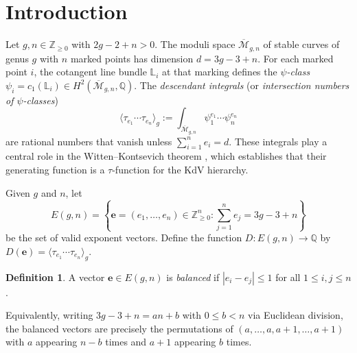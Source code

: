 \documentclass[12pt,reqno]{amsart}
\theoremstyle{definition}
\newtheorem{definition}[theorem]{Definition}
\newcommand{\humaninline}[1]{{\color{humancolor}\uwave{#1}}}
\newcommand{\aiinline}[1]{{\color{aicolor}\uwave{#1}}}
\newcommand{\Mbar}{\overline{\mathcal{M}}}
\newcommand{\ee}{\mathbf{e}}
\newcommand{\ZZ}{\mathbb{Z}}
\newcommand{\QQ}{\mathbb{Q}}
\begin{document}
\section{Introduction}\label{sec:intro}

\begin{aiparagraph}
Let $g, n \in \ZZ_{\geq 0}$ with $2g - 2 + n > 0$. The moduli space $\Mbar_{g,n}$ of stable curves of genus $g$ with $n$ marked points has dimension $d = 3g - 3 + n$. For each marked point $i$, the cotangent line bundle $\mathbb{L}_i$ at that marking defines the \emph{$\psi$-class} $\psi_i = c_1(\mathbb{L}_i) \in H^2(\Mbar_{g,n}, \QQ)$. The \emph{descendant integrals} (or \emph{intersection numbers of $\psi$-classes})
\[
\langle \tau_{e_1} \cdots \tau_{e_n} \rangle_g := \int_{\Mbar_{g,n}} \psi_1^{e_1} \cdots \psi_n^{e_n}
\]
are rational numbers that vanish unless $\sum_{i=1}^n e_i = d$. These integrals play a central role in the Witten--Kontsevich theorem \cite{Witten1991, Kontsevich1992}, which establishes that their generating function is a $\tau$-function for the KdV hierarchy.

Given $g$ and $n$, let
\[
E(g,n) = \left\{ \ee = (e_1, \ldots, e_n) \in \ZZ_{\geq 0}^n : \sum_{j=1}^n e_j = 3g - 3 + n \right\}
\]
be the set of valid exponent vectors. Define the function $D : E(g,n) \to \QQ$ by $D(\ee) = \langle \tau_{e_1} \cdots \tau_{e_n} \rangle_g$.

\begin{definition}
A vector $\ee \in E(g,n)$ is \emph{balanced} if $|e_i - e_j| \leq 1$ for all $1 \leq i, j \leq n$.
\end{definition}

Equivalently, writing $3g - 3 + n = an + b$ with $0 \leq b < n$ via Euclidean division, the balanced vectors are precisely the permutations of $(a, \ldots, a, a+1, \ldots, a+1)$ with $a$ appearing $n - b$ times and $a + 1$ appearing $b$ times.


\end{aiparagraph}
\end{document}
